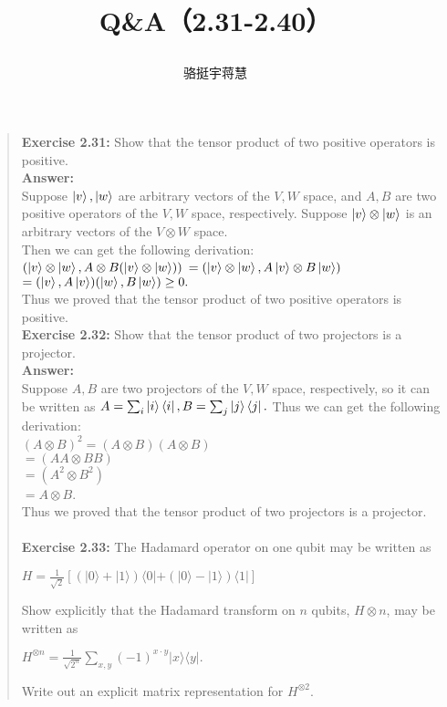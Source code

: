 \documentclass[UTF8]{ctexart}
\begin{document}
	\title{\textbf{Q\&A（2.31-2.40）}\\[1ex]\begin{large}
		\end{large}}
	\author{骆挺宇\quad 蒋慧}
	\maketitle
\begin{quote}
\textbf{Exercise 2.31: } Show that the tensor product of two positive operators is positive.
\\
\textbf{Answer:}\\
Suppose $\ket{v}, \ket{w} $ are arbitrary vectors of  the $V, W$ space, and $A, B$ are  two positive operators of  the $V, W$ space, respectively. Suppose  $\ket{v} \otimes \ket{w}$ is an arbitrary vectors of the $V \otimes W$ space.
\\
Then we can get the following derivation: \\
$(\ket{v} \otimes \ket{w}, A \otimes B (\ket{v} \otimes \ket{w}))$
$=(\ket{v} \otimes \ket{w}, A\ket{v} \otimes B\ket{w})$ 
$=(\ket{v} , A\ket{v})( \ket{w}, B\ket{w}) \geq 0.$
\\
Thus we proved that the tensor product of two positive operators is positive.
\\

\textbf{Exercise 2.32:  } Show that the tensor product of two projectors is a projector.
	\\ 
\textbf{Answer:}\\
	 Suppose $A, B$ are  two projectors of  the $V, W$ space, respectively, so it can be written as $A= \sum_{i} \ket{i} \bra{i}, B= \sum_{j} \ket{j} \bra{j}. $
	Thus we can get the following derivation: \\
	$(A\otimes B)^{2}=(A\otimes B)(A\otimes B)$\\
	 \hspace*{1.58cm}$=(AA\otimes BB)$\\
	 \hspace*{1.58cm}$=(A^{2}\otimes B^{2})$ \\
	 \hspace*{1.58cm}$=A \otimes B$.
	\\
	Thus we proved that the tensor product of two projectors is a projector.
	\\  \\
\textbf{Exercise 2.33:} The Hadamard operator on one qubit may be written as 
\begin{center}
$H=\frac{1}{\sqrt{2}}[(|0\rangle+|1\rangle)\langle 0|+(|0\rangle-|1\rangle)\langle 1|]$\\
\end{center}
Show explicitly that the Hadamard transform on $n$ qubits, $H\otimes n$, may be written as
 \begin{center}
$ H^{\otimes n}=\frac{1}{\sqrt{2^{n}}} \sum_{x, y}(-1)^{x \cdot y}|x\rangle\langle y|.$
 \end{center}
 Write out an explicit matrix representation for $H^{\otimes 2}$.\\
 

\end{quote}
\end{document}
